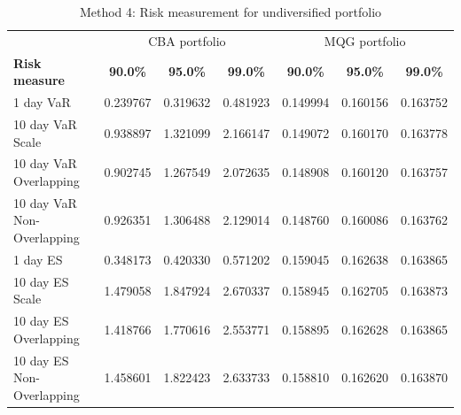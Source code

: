 \begin{table}[H]
    \centering
    \begin{tabular}{@{} l c c c | c c c @{}}
        \toprule
        &\multicolumn{3}{c}{CBA portfolio}&\multicolumn{3}{c}{MQG portfolio}\\
        \textbf{Risk measure} & \textbf{90.0\%} & \textbf{95.0\%} & \textbf{99.0\%}& \textbf{90.0\%} & \textbf{95.0\%} & \textbf{99.0\%} \\
        \midrule
        1 day VaR                & 0.239767 & 0.319632 & 0.481923 & 0.149994 & 0.160156 & 0.163752\\
        10 day VaR Scale         & 0.938897 & 1.321099 & 2.166147 & 0.149072 & 0.160170 & 0.163778\\
        10 day VaR Overlapping    & 0.902745 & 1.267549 & 2.072635 & 0.148908 & 0.160120 & 0.163757\\
        10 day VaR Non-Overlapping & 0.926351 & 1.306488 & 2.129014 & 0.148760 & 0.160086 & 0.163762\\
        1 day ES                 & 0.348173 & 0.420330 & 0.571202 & 0.159045 & 0.162638 & 0.163865\\
        10 day ES Scale          & 1.479058 & 1.847924 & 2.670337 & 0.158945 & 0.162705 & 0.163873\\
        10 day ES Overlapping      & 1.418766 & 1.770616 & 2.553771 & 0.158895 & 0.162628 & 0.163865\\
        10 day ES Non-Overlapping  & 1.458601 & 1.822423 & 2.633733 & 0.158810 & 0.162620 & 0.163870\\ \bottomrule
    \end{tabular}
    \caption{Method 4: Risk measurement for undiversified portfolio}
    \label{tab:method_4_undiversified_port}
\end{table}
